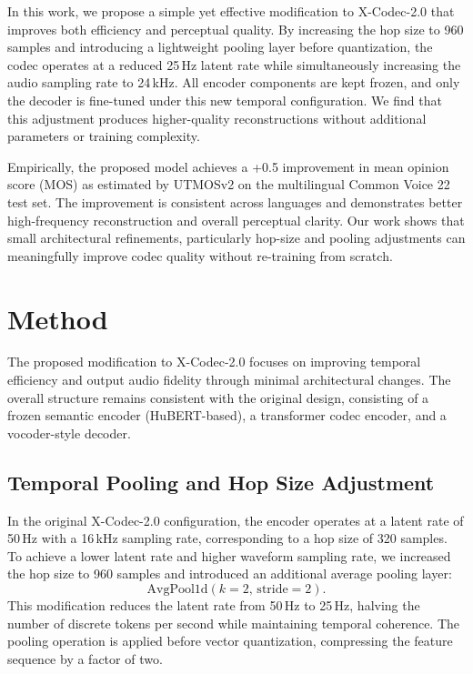 \documentclass[preprint]{article}
\begin{document}
In this work, we propose a simple yet effective modification to X-Codec-2.0 that improves both efficiency and perceptual quality.  
By increasing the hop size to 960 samples and introducing a lightweight pooling layer before quantization, the codec operates at a reduced 25\,Hz latent rate while simultaneously increasing the audio sampling rate to 24\,kHz.  
All encoder components are kept frozen, and only the decoder is fine-tuned under this new temporal configuration.  
We find that this adjustment produces higher-quality reconstructions without additional parameters or training complexity.

Empirically, the proposed model achieves a +0.5 improvement in mean opinion score (MOS) as estimated by UTMOSv2 on the multilingual Common Voice 22 test set.  
The improvement is consistent across languages and demonstrates better high-frequency reconstruction and overall perceptual clarity.  
Our work shows that small architectural refinements, particularly hop-size and pooling adjustments can meaningfully improve codec quality without re-training from scratch.

\section{Method}

The proposed modification to X-Codec-2.0 focuses on improving temporal efficiency and output audio fidelity through minimal architectural changes. The overall structure remains consistent with the original design, consisting of a frozen semantic encoder (HuBERT-based), a transformer codec encoder, and a vocoder-style decoder.

\subsection{Temporal Pooling and Hop Size Adjustment}
In the original X-Codec-2.0 configuration, the encoder operates at a latent rate of 50\,Hz with a 16\,kHz sampling rate, corresponding to a hop size of 320 samples. To achieve a lower latent rate and higher waveform sampling rate, we increased the hop size to 960 samples and introduced an additional average pooling layer:
\[
\text{AvgPool1d}(k=2,\, \text{stride}=2).
\]
This modification reduces the latent rate from 50\,Hz to 25\,Hz, halving the number of discrete tokens per second while maintaining temporal coherence. The pooling operation is applied before vector quantization, compressing the feature sequence by a factor of two.
\end{document}
